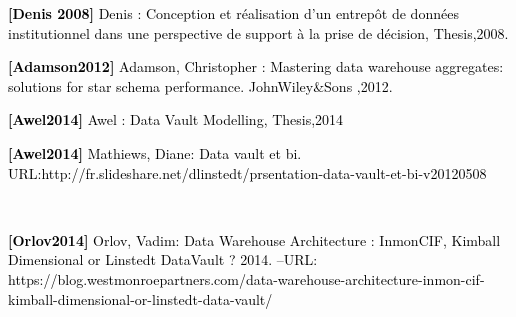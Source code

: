 \documentclass[a4paper,12pt]{report}
\begin{document}
	\item[] \textcolor{black}{
\textbf{[Denis 2008]} Denis : Conception et réalisation d’un entrepôt de données institutionnel dans une perspective de support à la prise de décision, Thesis,2008.}
\\

	\item[] \textcolor{black}{
\textbf{[Adamson2012] } Adamson, Christopher : Mastering data warehouse aggregates: solutions for star schema performance. JohnWiley&Sons ,2012.}
\\

	\item[] \textcolor{black}{
\textbf{[Awel2014]}  Awel : Data Vault Modelling, Thesis,2014}
\\

	\item[] \textcolor{black}{
\textbf{[Awel2014]} Mathiews, Diane: Data vault et bi. URL:http://fr.slideshare.net/dlinstedt/prsentation-data-vault-et-bi-v20120508}

\\
	\item[] \textcolor{black}{
\textbf{[Orlov2014] } Orlov, Vadim: Data Warehouse Architecture : InmonCIF, Kimball Dimensional or Linstedt DataVault ? 2014. –URL: https://blog.westmonroepartners.com/data-warehouse-architecture-inmon-cif-kimball-dimensional-or-linstedt-data-vault/}
\\
\end{document}
